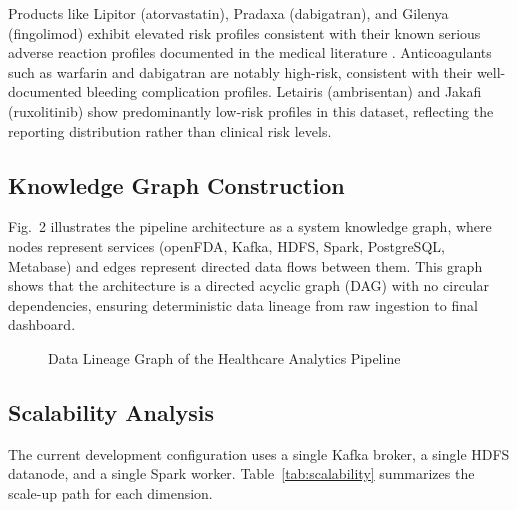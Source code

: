 \documentclass[conference]{IEEEtran}
\begin{document}
Products like Lipitor (atorvastatin), Pradaxa (dabigatran), and Gilenya (fingolimod) exhibit elevated risk profiles consistent with their known serious adverse reaction profiles documented in the medical literature \cite{pradaxa, gilenya}. Anticoagulants such as warfarin and dabigatran are notably high-risk, consistent with their well-documented bleeding complication profiles. Letairis (ambrisentan) and Jakafi (ruxolitinib) show predominantly low-risk profiles in this dataset, reflecting the reporting distribution rather than clinical risk levels.

\subsection{Knowledge Graph Construction}

Fig.~2 illustrates the pipeline architecture as a system knowledge graph, where nodes represent services (openFDA, Kafka, HDFS, Spark, PostgreSQL, Metabase) and edges represent directed data flows between them. This graph shows that the architecture is a directed acyclic graph (DAG) with no circular dependencies, ensuring deterministic data lineage from raw ingestion to final dashboard.

\begin{figure}[htbp]
\centering
{}
\caption{Data Lineage Graph of the Healthcare Analytics Pipeline}
\end{figure}

\subsection{Scalability Analysis}

The current development configuration uses a single Kafka broker, a single HDFS datanode, and a single Spark worker. Table~\ref{tab:scalability} summarizes the scale-up path for each dimension.
\end{document}
